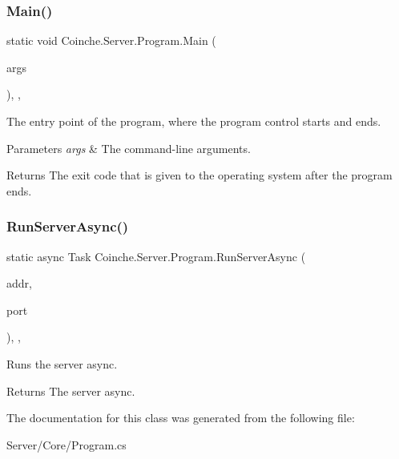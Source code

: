 \subsubsection{\texorpdfstring{Main()}{Main()}}
{\footnotesize\ttfamily static void Coinche.\+Server.\+Program.\+Main (\begin{DoxyParamCaption}\item[{String \mbox{[}$\,$\mbox{]}}]{args }\end{DoxyParamCaption})\hspace{0.3cm}{\ttfamily [inline]}, {\ttfamily [static]}, {\ttfamily [private]}}



The entry point of the program, where the program control starts and ends. 


\begin{DoxyParams}{Parameters}
{\em args} & The command-\/line arguments.\\
\hline
\end{DoxyParams}
\begin{DoxyReturn}{Returns}
The exit code that is given to the operating system after the program ends.
\end{DoxyReturn}
\mbox{\label{class_coinche_1_1_server_1_1_program_a376ce464c8f3725aa59134c9589a4ceb}} 
\subsubsection{\texorpdfstring{Run\+Server\+Async()}{RunServerAsync()}}
{\footnotesize\ttfamily static async Task Coinche.\+Server.\+Program.\+Run\+Server\+Async (\begin{DoxyParamCaption}\item[{I\+P\+Address}]{addr,  }\item[{short}]{port }\end{DoxyParamCaption})\hspace{0.3cm}{\ttfamily [inline]}, {\ttfamily [static]}, {\ttfamily [private]}}



Runs the server async. 

\begin{DoxyReturn}{Returns}
The server async.
\end{DoxyReturn}


The documentation for this class was generated from the following file\+:\begin{DoxyCompactItemize}
\item 
Server/\+Core/Program.\+cs\end{DoxyCompactItemize}
